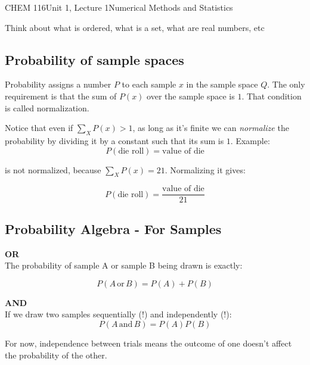 \documentclass{article}
\begin{document}
\begin{tdoc}{CHEM 116}{Unit 1, Lecture 1}{Numerical Methods and Statistics}
\begin{enumerate}
\end{enumerate}

Think about what is ordered, what is a set, what are real numbers, etc

\subsection{Probability of sample spaces}
Probability assigns a number $P$ to each sample $x$ in the sample
space $Q$. The only requirement is that the sum of $P(x)$ over the
sample space is $1$. That condition is called normalization.

Notice that even if $\sum_{X} P(x) > 1$, as long as it's finite we can
\emph{normalize} the probability by dividing it by a constant such
that its sum is $1$. Example:
\begin{equation}
P(\textrm{die roll}) = \textrm{value of die}
\end{equation}

is not normalized, because $\sum_X P(x) = 21$. Normalizing it gives:

\begin{equation}
P(\textrm{die roll}) = \frac{\textrm{value of die}}{21}
\end{equation}

\subsection{Probability Algebra - For Samples}

{\bf OR}\vspace{0.5cm}\\
The probability of sample A or sample B being drawn is exactly:

\begin{equation}
P(A\,\textrm{or}\,B) = P(A) + P(B)
\end{equation}
\vspace{0.2cm}

{\bf AND}\vspace{0.5cm}\\

If we draw two samples sequentially (!) and independently (!):
\begin{equation}
P(A\,\textrm{and}\,B) = P(A)P(B)
\end{equation}

For now, independence between trials means the outcome of one doesn't
affect the probability of the other.

\vspace{0.2cm}


\end{tdoc}
\end{document}
